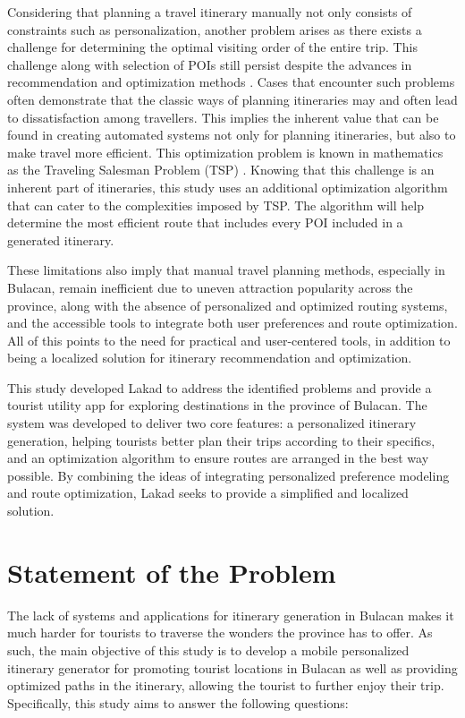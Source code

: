 Considering that planning a travel itinerary manually not only consists of constraints such as personalization, another problem arises as there exists a challenge for determining the optimal visiting order of the entire trip. This challenge along with selection of POIs still persist despite the advances in recommendation and optimization methods \parencite{papadakis2024, Porras2022, Yulfihani2024}. Cases that encounter such problems often demonstrate that the classic ways of planning itineraries may and often lead to dissatisfaction among travellers. This implies the inherent value that can be found in creating automated systems not only for planning itineraries, but also to make travel more efficient. This optimization problem is known in mathematics as the Traveling Salesman Problem (TSP) \parencite{Wu2020}. Knowing that this challenge is an inherent part of itineraries, this study uses an additional optimization algorithm that can cater to the complexities imposed by TSP. The algorithm will help determine the most efficient route that includes every POI included in a generated itinerary.

These limitations also imply that manual travel planning methods, especially in Bulacan, remain inefficient due to uneven attraction popularity across the province, along with the absence of personalized and optimized routing systems, and the accessible tools to integrate both user preferences and route optimization. All of this points to the need for practical and user-centered tools, in addition to being a localized solution for itinerary recommendation and optimization.

This study developed Lakad to address the identified problems and provide a tourist utility app for exploring destinations in the province of Bulacan. The system was developed to deliver two core features: a personalized itinerary generation, helping tourists better plan their trips according to their specifics, and an optimization algorithm to ensure routes are arranged in the best way possible. By combining the ideas of integrating personalized preference modeling and route optimization, Lakad seeks to provide a simplified and localized solution.


\section{Statement of the Problem}

The lack of systems and applications for itinerary generation in Bulacan makes it much harder for tourists to traverse the wonders the province has to offer. As such, the main objective of this study is to develop a mobile personalized itinerary generator for promoting tourist locations in Bulacan as well as providing optimized paths in the itinerary, allowing the tourist to further enjoy their trip. Specifically, this study aims to answer the following questions:

